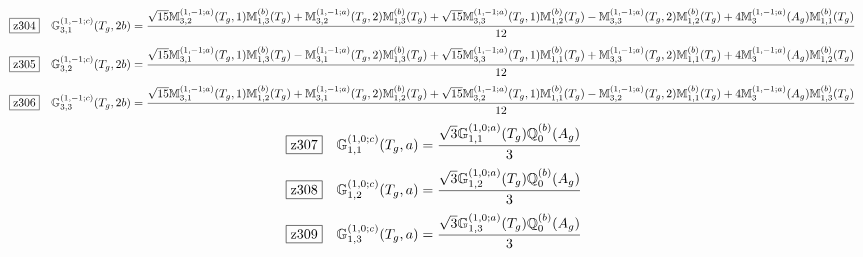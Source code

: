 \documentclass[fleqn,10pt,landscape]{jsarticle}
\begin{document}
\begin{dmath*}
\hspace*{3mm}\fbox{z304}\quad \mathbb{G}_{3,1}^{(1,-1;c)}(T_{g},2b)=\frac{\sqrt{15} \mathbb{M}_{3,2}^{(1,-1;a)}(T_{g},1) \mathbb{M}_{1,3}^{(b)}(T_{g}) + \mathbb{M}_{3,2}^{(1,-1;a)}(T_{g},2) \mathbb{M}_{1,3}^{(b)}(T_{g}) + \sqrt{15} \mathbb{M}_{3,3}^{(1,-1;a)}(T_{g},1) \mathbb{M}_{1,2}^{(b)}(T_{g}) - \mathbb{M}_{3,3}^{(1,-1;a)}(T_{g},2) \mathbb{M}_{1,2}^{(b)}(T_{g}) + 4 \mathbb{M}_{3}^{(1,-1;a)}(A_{g}) \mathbb{M}_{1,1}^{(b)}(T_{g})}{12}
\end{dmath*}
\begin{dmath*}
\hspace*{3mm}\fbox{z305}\quad \mathbb{G}_{3,2}^{(1,-1;c)}(T_{g},2b)=\frac{\sqrt{15} \mathbb{M}_{3,1}^{(1,-1;a)}(T_{g},1) \mathbb{M}_{1,3}^{(b)}(T_{g}) - \mathbb{M}_{3,1}^{(1,-1;a)}(T_{g},2) \mathbb{M}_{1,3}^{(b)}(T_{g}) + \sqrt{15} \mathbb{M}_{3,3}^{(1,-1;a)}(T_{g},1) \mathbb{M}_{1,1}^{(b)}(T_{g}) + \mathbb{M}_{3,3}^{(1,-1;a)}(T_{g},2) \mathbb{M}_{1,1}^{(b)}(T_{g}) + 4 \mathbb{M}_{3}^{(1,-1;a)}(A_{g}) \mathbb{M}_{1,2}^{(b)}(T_{g})}{12}
\end{dmath*}
\begin{dmath*}
\hspace*{3mm}\fbox{z306}\quad \mathbb{G}_{3,3}^{(1,-1;c)}(T_{g},2b)=\frac{\sqrt{15} \mathbb{M}_{3,1}^{(1,-1;a)}(T_{g},1) \mathbb{M}_{1,2}^{(b)}(T_{g}) + \mathbb{M}_{3,1}^{(1,-1;a)}(T_{g},2) \mathbb{M}_{1,2}^{(b)}(T_{g}) + \sqrt{15} \mathbb{M}_{3,2}^{(1,-1;a)}(T_{g},1) \mathbb{M}_{1,1}^{(b)}(T_{g}) - \mathbb{M}_{3,2}^{(1,-1;a)}(T_{g},2) \mathbb{M}_{1,1}^{(b)}(T_{g}) + 4 \mathbb{M}_{3}^{(1,-1;a)}(A_{g}) \mathbb{M}_{1,3}^{(b)}(T_{g})}{12}
\end{dmath*}
\begin{dmath*}
\hspace*{3mm}\fbox{z307}\quad \mathbb{G}_{1,1}^{(1,0;c)}(T_{g},a)=\frac{\sqrt{3} \mathbb{G}_{1,1}^{(1,0;a)}(T_{g}) \mathbb{Q}_{0}^{(b)}(A_{g})}{3}
\end{dmath*}
\begin{dmath*}
\hspace*{3mm}\fbox{z308}\quad \mathbb{G}_{1,2}^{(1,0;c)}(T_{g},a)=\frac{\sqrt{3} \mathbb{G}_{1,2}^{(1,0;a)}(T_{g}) \mathbb{Q}_{0}^{(b)}(A_{g})}{3}
\end{dmath*}
\begin{dmath*}
\hspace*{3mm}\fbox{z309}\quad \mathbb{G}_{1,3}^{(1,0;c)}(T_{g},a)=\frac{\sqrt{3} \mathbb{G}_{1,3}^{(1,0;a)}(T_{g}) \mathbb{Q}_{0}^{(b)}(A_{g})}{3}
\end{dmath*}
\end{document}
